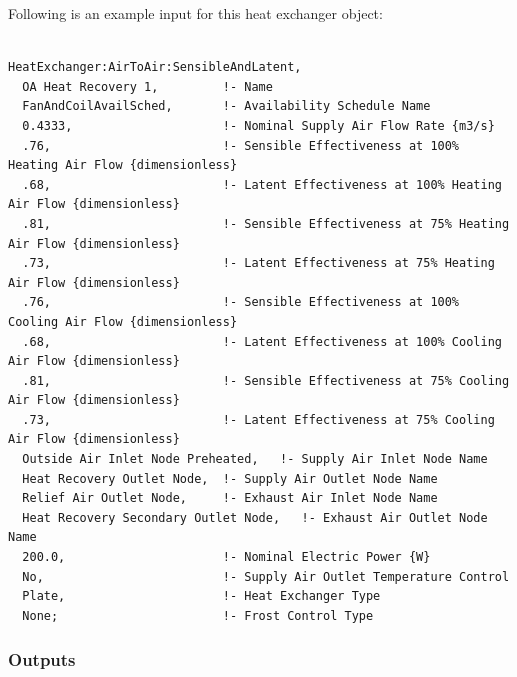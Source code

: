 Following is an example input for this heat exchanger object:

\begin{lstlisting}

HeatExchanger:AirToAir:SensibleAndLatent,
  OA Heat Recovery 1,         !- Name
  FanAndCoilAvailSched,       !- Availability Schedule Name
  0.4333,                     !- Nominal Supply Air Flow Rate {m3/s}
  .76,                        !- Sensible Effectiveness at 100% Heating Air Flow {dimensionless}
  .68,                        !- Latent Effectiveness at 100% Heating Air Flow {dimensionless}
  .81,                        !- Sensible Effectiveness at 75% Heating Air Flow {dimensionless}
  .73,                        !- Latent Effectiveness at 75% Heating Air Flow {dimensionless}
  .76,                        !- Sensible Effectiveness at 100% Cooling Air Flow {dimensionless}
  .68,                        !- Latent Effectiveness at 100% Cooling Air Flow {dimensionless}
  .81,                        !- Sensible Effectiveness at 75% Cooling Air Flow {dimensionless}
  .73,                        !- Latent Effectiveness at 75% Cooling Air Flow {dimensionless}
  Outside Air Inlet Node Preheated,   !- Supply Air Inlet Node Name
  Heat Recovery Outlet Node,  !- Supply Air Outlet Node Name
  Relief Air Outlet Node,     !- Exhaust Air Inlet Node Name
  Heat Recovery Secondary Outlet Node,   !- Exhaust Air Outlet Node Name
  200.0,                      !- Nominal Electric Power {W}
  No,                         !- Supply Air Outlet Temperature Control
  Plate,                      !- Heat Exchanger Type
  None;                       !- Frost Control Type
\end{lstlisting}

\subsubsection{Outputs}\label{outputs-1-012}

